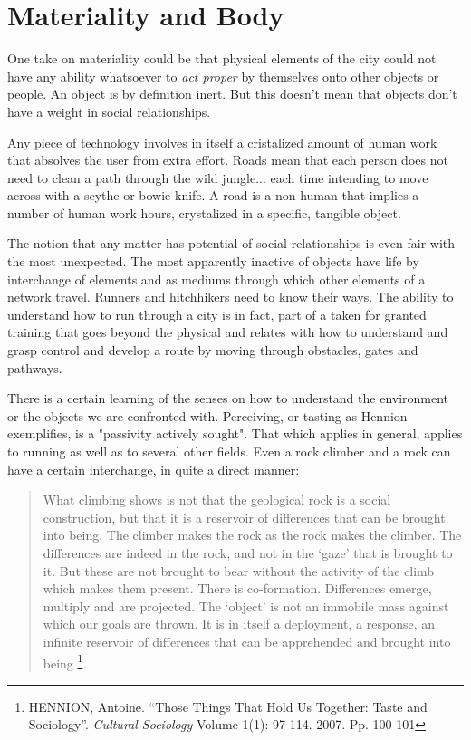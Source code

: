\section*{Materiality and Body}

One take on materiality could be that physical elements of the city could not have any ability whatsoever to \textit{act proper} by themselves onto other objects or people. An object is by definition inert. But this doesn't mean that objects don't have a weight in social relationships. 

Any piece of technology involves in itself a cristalized amount of human work that absolves the user from extra effort. Roads mean that each person does not need to clean a path through the wild jungle... each time intending to move across with a scythe or bowie knife.
A road is a non-human that implies a number of human work hours, crystalized in a specific, tangible object.
%

The notion that any matter has potential of %
social relationships is even fair with the most unexpected.
The most apparently inactive of objects have life by interchange of elements and as mediums through which other elements of a network travel. Runners and hitchhikers need to know their ways. The ability to understand how to run through a city is in fact, part of a taken for granted training that goes beyond the physical and relates with how to understand and grasp control and develop a route by moving through obstacles, gates and pathways. 

There is a certain learning of the senses on how to understand the environment or the objects we are confronted with. Perceiving, or tasting as Hennion exemplifies, is a "passivity actively sought". That which applies in general, applies to running as well as to several other fields. Even a rock climber and a rock can have a certain interchange, in quite a direct manner:

\begin{quote}
 What climbing shows is not that the geological rock is a social construction, but that it is a reservoir of differences that can be brought into being. The climber makes the rock as the rock makes the climber. The differences are indeed in the rock, and not in the ‘gaze’ that is brought to it. But these are not brought to bear without the activity of the climb which makes them present. There is co-formation. Differences emerge, multiply and are projected. The ‘object’ is not an immobile mass against which our goals are thrown. It is in itself a deployment, a response, an infinite reservoir of differences that can be apprehended and brought into being%
 \footnote{HENNION, Antoine. ``Those Things That Hold Us Together: Taste and Sociology''. \textit{Cultural Sociology} Volume 1(1): 97-114. 2007. Pp. 100-101}.
\end{quote}

